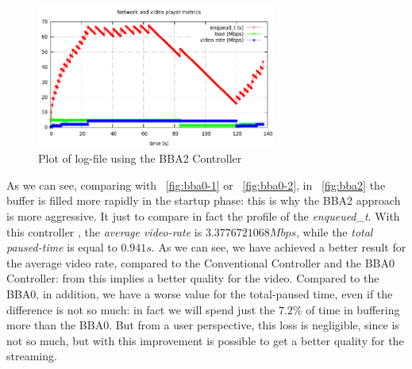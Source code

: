 \documentclass[a4paper]{report}
\begin{document}
\begin{figure}[H]
  \begin{center}
    \includegraphics[width=0.7\textwidth]{bba2plot}
  \end{center}
  \caption{Plot of log-file using the BBA2 Controller}\label{bba2}
\end{figure}

As we can see, comparing with ~\ref{fig:bba0-1} or ~\ref{fig:bba0-2}, in ~\ref{fig:bba2} the buffer is filled more rapidly in the startup phase: this is why the BBA2 approach is more aggressive. It just to compare in fact the profile of the \textit{enqueued\_t}.
With this controller , the \textit{average video-rate} is $3.3776721068 Mbps$, while the \textit{total paused-time} is equal to $0.941 s$.
As we can see, we have achieved a better result for the average video rate, compared to the Conventional Controller and the BBA0 Controller: from this implies a better quality for the video. Compared to the BBA0, in addition, we have a worse value for the total-paused time, even if the difference is not so much: in fact we will spend just the $7.2\%$ of time in buffering more than the BBA0.
But from a user perspective, this loss is negligible, since is not so much, but with this improvement is possible to get a better quality for the streaming.




\end{document}
